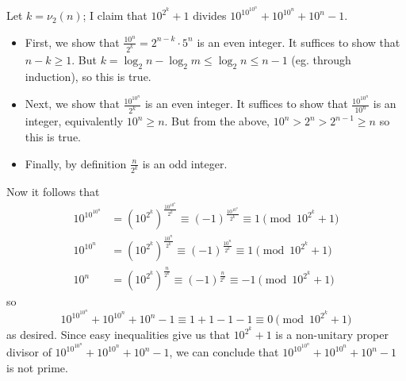 Let $k=\nu_2(n)$; I claim that $10^{2^k}+1$ divides $10^{10^{10^n}}+10^{10^n}+10^n-1$.
\begin{itemize}
	\item First, we show that $\frac{10^n}{2^k}=2^{n-k}\cdot5^n$ is an even integer. It suffices to show that $n-k\geq1$. But $k=\log_2n-\log_2m\leq\log_2n\leq n-1$ (eg. through induction), so this is true.
	\item Next, we show that $\frac{10^{10^n}}{2^k}$ is an even integer. It suffices to show that $\frac{10^{10^n}}{10^n}$ is an integer, equivalently $10^n\geq n$. But from the above, $10^n>2^n>2^{n-1}\geq n$ so this is true.
	\item Finally, by definition $\frac{n}{2^k}$ is an odd integer.
\end{itemize}
Now it follows that
\begin{align*}
	10^{10^{10^n}}&=\left(10^{2^k}\right)^{\frac{10^{10^n}}{2^k}}\equiv(-1)^{\frac{10^{10^n}}{2^k}}\equiv1\pmod{10^{2^k}+1}\\
	10^{10^n}&=\left(10^{2^k}\right)^{\frac{10^n}{2^k}}\equiv(-1)^{\frac{10^n}{2^k}}\equiv1\pmod{10^{2^k}+1}\\
	10^n&=\left(10^{2^k}\right)^{\frac{n}{2^k}}\equiv(-1)^{\frac{n}{2^k}}\equiv-1\pmod{10^{2^k}+1}
\end{align*}
so \[10^{10^{10^n}}+10^{10^n}+10^n-1\equiv1+1-1-1\equiv0\pmod{10^{2^k}+1}\] as desired. Since easy inequalities give us that $10^{2^k}+1$ is a non-unitary proper divisor of $10^{10^{10^n}}+10^{10^n}+10^n-1$, we can conclude that $10^{10^{10^n}}+10^{10^n}+10^n-1$ is not prime.